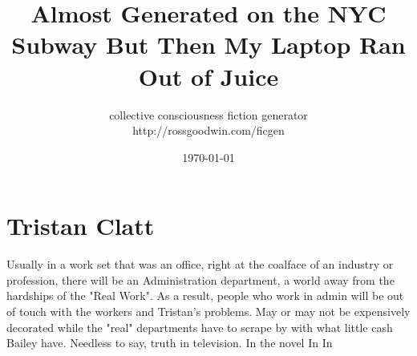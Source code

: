 \documentclass[12pt]{book}
\title{Almost Generated on the NYC Subway But Then My Laptop Ran Out of Juice}
\author{collective consciousness fiction generator\\http://rossgoodwin.com/ficgen}
\date{\today}
\begin{document}
\maketitle



\chapter{Tristan Clatt}

Usually in a work set that was an office, right at the coalface of an industry or profession, there will be an Administration department, a world away from the hardships of the "Real Work". As a result, people who work in admin will be out of touch with the workers and Tristan's problems. May or may not be expensively decorated while the "real" departments have to scrape by with what little cash Bailey have. Needless to say, truth in television. In the novel In In
\end{document}
